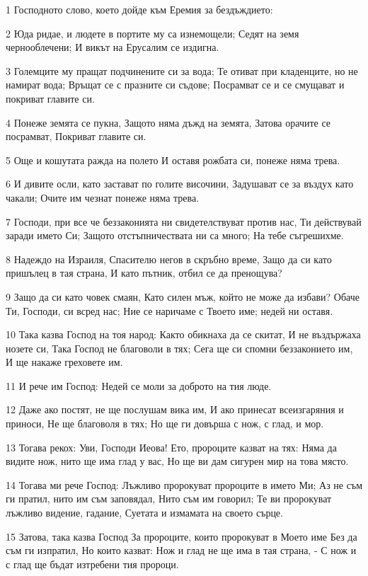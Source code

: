 \par 1 Господното слово, което дойде към Еремия за бездъждието:
\par 2 Юда ридае, и людете в портите му са изнемощели; Седят на земя чернооблечени; И викът на Ерусалим се издигна.
\par 3 Големците му пращат подчинените си за вода; Те отиват при кладенците, но не намират вода; Връщат се с празните си съдове; Посрамват се и се смущават и покриват главите си.
\par 4 Понеже земята се пукна, Защото няма дъжд на земята, Затова орачите се посрамват, Покриват главите си.
\par 5 Още и кошутата ражда на полето И оставя рожбата си, понеже няма трева.
\par 6 И дивите осли, като застават по голите височини, Задушават се за въздух като чакали; Очите им чезнат понеже няма трева.
\par 7 Господи, при все че беззаконията ни свидетелствуват против нас, Ти действувай заради името Си; Защото отстъпничествата ни са много; На тебе съгрешихме.
\par 8 Надеждо на Израиля, Спасителю негов в скръбно време, Защо да си като пришълец в тая страна, И като пътник, отбил се да пренощува?
\par 9 Защо да си като човек смаян, Като силен мъж, който не може да избави? Обаче Ти, Господи, си всред нас; Ние се наричаме с Твоето име; недей ни оставя.
\par 10 Така казва Господ на тоя народ: Както обикнаха да се скитат, И не въздържаха нозете си, Така Господ не благоволи в тях; Сега ще си спомни беззаконието им, И ще накаже греховете им.
\par 11 И рече им Господ: Недей се моли за доброто на тия люде.
\par 12 Даже ако постят, не ще послушам вика им, И ако принесат всеизгаряния и приноси, Не ще благоволя в тях; Но ще ги довърша с нож, с глад, и мор.
\par 13 Тогава рекох: Уви, Господи Иеова! Ето, пророците казват на тях: Няма да видите нож, нито ще има глад у вас, Но ще ви дам сигурен мир на това място.
\par 14 Тогава ми рече Господ: Лъжливо пророкуват пророците в името Ми; Аз не съм ги пратил, нито им съм заповядал, Нито съм им говорил; Те ви пророкуват лъжливо видение, гадание, Суетата и измамата на своето сърце.
\par 15 Затова, така казва Господ За пророците, които пророкуват в Моето име Без да съм ги изпратил, Но които казват: Нож и глад не ще има в тая страна, - С нож и с глад ще бъдат изтребени тия пророци.

